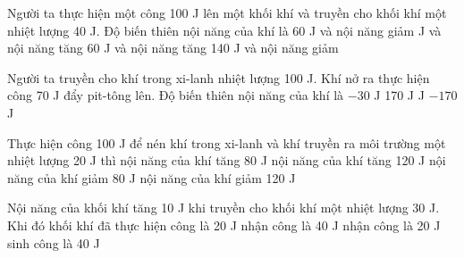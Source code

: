\begin{vidu}%
Người ta thực hiện một công 100 J lên một khối khí và truyền cho khối khí một nhiệt lượng 40 J. Độ biến thiên nội năng của khí là
\choice
{60 J và nội năng giảm}
{ J và nội năng tăng}
{60 J và nội năng tăng}
{140 J và nội năng giảm}
\end{vidu}	
\begin{vidu}%
Người ta truyền cho khí trong xi-lanh nhiệt lượng 100 J. Khí nở ra thực hiện công 70 J đẩy pit-tông lên. Độ biến thiên nội năng của khí là
\choice
{$-30$ J}
{170 J}
{ J}
{$-170$ J}
\end{vidu}
\begin{vidu}%
Thực hiện công 100 J để nén khí trong xi-lanh và khí truyền ra môi trường một nhiệt lượng 20 J thì
\choice
{\True nội năng của khí tăng 80 J}
{nội năng của khí tăng 120 J}
{nội năng của khí giảm 80 J}
{nội năng của khí giảm 120 J}
\end{vidu}
\begin{vidu}%
Nội năng của khối khí tăng 10 J khi truyền cho khối khí một nhiệt lượng 30 J. Khi đó khối khí đã
\choice
{\True thực hiện công là 20 J}
{nhận công là 40 J}
{nhận công là 20 J}
{sinh công là 40 J}
\end{vidu}

